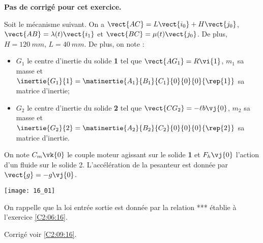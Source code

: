 \normaltrue \difficilefalse \tdifficilefalse
\correctionfalse


\setcounter{question}{0}

\ifcorrection
\else
\textbf{Pas de corrigé pour cet exercice.}
\fi

\ifprof
\else
Soit le mécanisme suivant. On a $\vect{AC}=L\vect{i_0}+H\vect{j_0}$, $\vect{AB}=\lambda(t)\vect{i_1}$ et $\vect{BC}=\mu(t)\vect{j_0}$. De plus, 
$H=\SI{120}{mm}$, $L=\SI{40}{mm}$. De plus, on note :
\begin{itemize}
\item $G_1$ le centre d'inertie du solide \textbf{1} tel que $\vect{AG_1}={R} \vi{1}$, $m_1$ sa masse et $\inertie{G_1}{1}=\matinertie{A_1}{B_1}{C_1}{0}{0}{0}{\rep{1}}$ sa matrice d'inertie;
\item $G_2$ le centre d'inertie du solide \textbf{2} tel que $\vect{CG_2}=-\ell b\vj{0}$, $m_2$ sa masse et $\inertie{G_2}{2}=\matinertie{A_2}{B_2}{C_2}{0}{0}{0}{\rep{2}}$ sa matrice d'inertie.
\end{itemize}
On note $C_m\vk{0}$ le couple moteur agissant sur le solide \textbf{1} et $F_h\vj{0}$ l'action d'un fluide sur le solide 2.  L'accélération de la pesanteur est donnée par $\vect{g}=-g\vj{0}$.

\begin{center}
\texttt{[image: 16\_01]}
\end{center}
\fi

On rappelle que la loi entrée sortie est donnée par la relation *** établie à l'exercice \ref{C2:06:16}.

\ifprof
\else
\fi

\ifprof
\else
\fi

\ifprof
\else
\fi

\ifprof
\else
\fi

\ifprof
\else
\fi

\ifprof
\else
\begin{flushright}
\footnotesize{Corrigé  voir \ref{C2:09:16}.}
\end{flushright}%
\fi